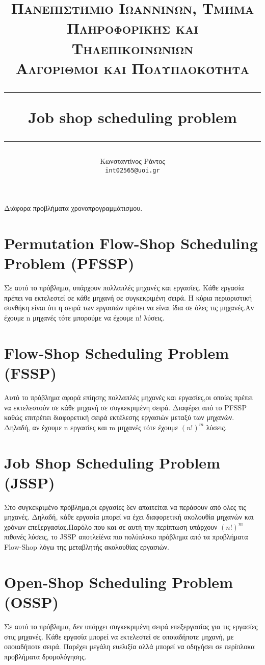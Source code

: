 \documentclass{article}
\title{%
   \normalsize \textsc{Πανεπιστήμιο Ιωαννίνων, Τμήμα Πληροφορικής και Τηλεπικοινωνίων} \\ [1em]
   \normalsize \textsc{Αλγόριθμοι και Πολυπλοκότητα} \\ [1em]
   \vspace{0.5cm}
   \hrule
   \vspace{0.4cm}
   \huge Job shop scheduling problem
   \vspace{0.5cm}
   \hrule
   \vspace{0.5cm}
}
\author{%
   \normalfont
   Κωνσταντίνος Ράντος\\
   \texttt{int02565@uoi.gr}  
}
\date{}
\begin{document}
\maketitle


\vspace{0.4cm}
\begin{center}
\Large Διάφορα προβλήματα χρονοπρογραμμάτισμου.
\end{center}



\section {Permutation Flow-Shop Scheduling Problem (PFSSP) }
Σε αυτό το πρόβλημα, υπάρχουν πολλαπλές μηχανές και εργασίες. Κάθε εργασία πρέπει να εκτελεστεί σε κάθε μηχανή σε συγκεκριμένη σειρά. Η κύρια περιοριστική συνθήκη είναι ότι η σειρά των εργασιών πρέπει να είναι ίδια σε όλες τις μηχανές.Αν έχουμε n μηχανές τότε μπορούμε να έχουμε n! λύσεις.

\section{Flow-Shop Scheduling Problem (FSSP)}
Αυτό το πρόβλημα αφορά επίησης πολλαπλές μηχανές και εργασίες,οι οποίες πρέπει να εκτελεστούν σε κάθε μηχανή σε συγκεκριμένη σειρά. Διαφέρει από το PFSSP καθώς επιτρέπει διαφορετική σειρά εκτέλεσης εργασιών μεταξύ των μηχανών. Δηλαδή, αν έχουμε n εργασίες και m μηχανές τότε έχουμε $(n!)^m$ λύσεις.

\section{Job Shop Scheduling Problem (JSSP)}
Στο συγκεκριμένο πρόβλημα,οι εργασίες δεν απαιτείται να περάσουν από όλες τις μηχανές. Δηλαδή, κάθε εργασία μπορεί να έχει διαφορετική ακολουθία μηχανών και χρόνων επεξεργασίας.Παρόλο που και σε αυτή την περίπτωση υπάρχουν $(n!)^m$ πιθανές λύσεις, το JSSP αποτλείένα πιο πολύπλοκο πρόβλημα από τα προβλήματα Flow-Shop λόγω της μεταβλητής ακολουθίας εργασιών.

\section{Open-Shop Scheduling Problem (OSSP)}
Σε αυτό το πρόβλημα, δεν υπάρχει συγκεκριμένη σειρά επεξεργασίας για τις εργασίες στις μηχανές.
Κάθε εργασία μπορεί να εκτελεστεί σε οποιαδήποτε μηχανή, με οποιαδήποτε σειρά. Παρέχει μεγάλη ευελιξία αλλά μπορεί να οδηγήσει σε περίπλοκα προβλήματα δρομολόγησης.
\end{document}
